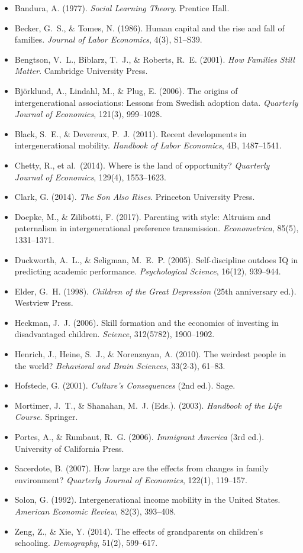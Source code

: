 \begin{itemize}[nosep, leftmargin=*]
\item Bandura, A. (1977). \textit{Social Learning Theory}. Prentice Hall.
\item Becker, G.~S., \& Tomes, N. (1986). Human capital and the rise and fall of families. \textit{Journal of Labor Economics}, 4(3), S1--S39.
\item Bengtson, V.~L., Biblarz, T.~J., \& Roberts, R.~E. (2001). \textit{How Families Still Matter}. Cambridge University Press.
\item Björklund, A., Lindahl, M., \& Plug, E. (2006). The origins of intergenerational associations: Lessons from Swedish adoption data. \textit{Quarterly Journal of Economics}, 121(3), 999--1028.
\item Black, S.~E., \& Devereux, P.~J. (2011). Recent developments in intergenerational mobility. \textit{Handbook of Labor Economics}, 4B, 1487--1541.
\item Chetty, R., et al.~(2014). Where is the land of opportunity? \textit{Quarterly Journal of Economics}, 129(4), 1553--1623.
\item Clark, G. (2014). \textit{The Son Also Rises}. Princeton University Press.
\item Doepke, M., \& Zilibotti, F. (2017). Parenting with style: Altruism and paternalism in intergenerational preference transmission. \textit{Econometrica}, 85(5), 1331--1371.
\item Duckworth, A.~L., \& Seligman, M.~E.~P. (2005). Self-discipline outdoes IQ in predicting academic performance. \textit{Psychological Science}, 16(12), 939--944.
\item Elder, G.~H. (1998). \textit{Children of the Great Depression} (25th anniversary ed.). Westview Press.
\item Heckman, J.~J. (2006). Skill formation and the economics of investing in disadvantaged children. \textit{Science}, 312(5782), 1900--1902.
\item Henrich, J., Heine, S.~J., \& Norenzayan, A. (2010). The weirdest people in the world? \textit{Behavioral and Brain Sciences}, 33(2-3), 61--83.
\item Hofstede, G. (2001). \textit{Culture's Consequences} (2nd ed.). Sage.
\item Mortimer, J.~T., \& Shanahan, M.~J. (Eds.). (2003). \textit{Handbook of the Life Course}. Springer.
\item Portes, A., \& Rumbaut, R.~G. (2006). \textit{Immigrant America} (3rd ed.). University of California Press.
\item Sacerdote, B. (2007). How large are the effects from changes in family environment? \textit{Quarterly Journal of Economics}, 122(1), 119--157.
\item Solon, G. (1992). Intergenerational income mobility in the United States. \textit{American Economic Review}, 82(3), 393--408.
\item Zeng, Z., \& Xie, Y. (2014). The effects of grandparents on children's schooling. \textit{Demography}, 51(2), 599--617.
\end{itemize}


